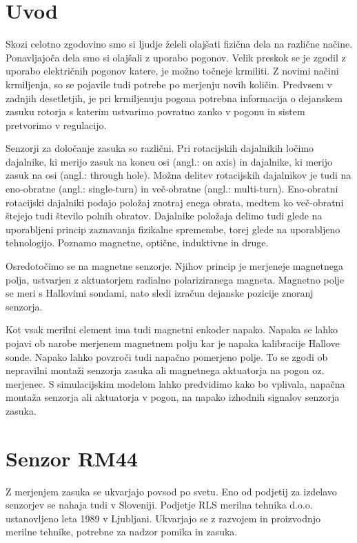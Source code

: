 \chapter{Uvod} \label{uvod}

Skozi celotno zgodovino smo si ljudje želeli olajšati fizična dela na različne načine. Ponavljajoča dela smo si olajšali z uporabo pogonov. Velik preskok se je zgodil z uporabo električnih pogonov katere, je možno točneje krmiliti. Z novimi načini krmiljenja, so se pojavile tudi potrebe po merjenju novih količin. Predvsem v zadnjih desetletjih, je pri krmiljenuju pogona potrebna informacija o dejanskem zasuku rotorja s katerim ustvarimo povratno zanko v pogonu in sistem pretvorimo v regulacijo.

Senzorji za določanje zasuka so različni. Pri rotacijskih dajalnikih ločimo dajalnike, ki merijo zasuk na koncu osi (angl.: on axis) in dajalnike, ki merijo zasuk na osi (angl.: through hole). Možna
delitev rotacijskih dajalnikov je tudi na eno-obratne (angl.: single-turn) in več-obratne
(angl.: multi-turn). Eno-obratni rotacijski dajalniki podajo položaj znotraj enega
obrata, medtem ko več-obratni štejejo tudi število polnih obratov.
Dajalnike položaja delimo tudi glede na uporabljeni princip zaznavanja fizikalne
spremembe, torej glede na uporabljeno tehnologijo. Poznamo magnetne, optične,
induktivne in druge\cite{killer}.

Osredotočimo se na magnetne senzorje. Njihov princip je merjeneje magnetnega polja, ustvarjen z aktuatorjem radialno polariziranega magneta. Magnetno polje se meri s Hallovimi sondami, nato sledi izračun dejanske pozicije znoranj senzorja.

Kot vsak merilni element ima tudi magnetni enkoder napako. Napaka se lahko pojavi ob narobe merjenem magnetnem polju kar je napaka kalibracije Hallove sonde. Napako lahko povzroči tudi napačno pomerjeno polje. To se zgodi ob nepravilni montaži senzorja zasuka ali magnetnega aktuatorja na pogon oz. merjenec. S simulacijskim modelom lahko predvidimo kako bo vplivala, napačna montaža senzorja ali aktuatorja v pogon, na napako izhodnih signalov senzorja zasuka.

\chapter{Senzor RM44}

Z merjenjem zasuka se ukvarjajo povsod po svetu. Eno od podjetij za izdelavo senzorjev se nahaja tudi v Sloveniji. Podjetje RLS merilna tehnika d.o.o. ustanovljeno leta 1989 v Ljubljani. Ukvarjajo se z razvojem in proizvodnjo merilne tehnike, potrebne za nadzor pomika in zasuka.


